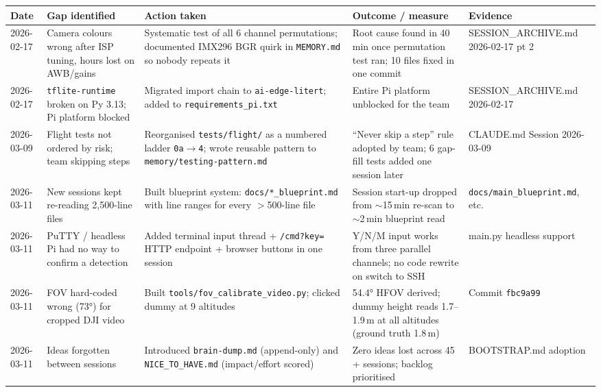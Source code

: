 \vspace{0.5em}
\footnotesize
{}
\begin{longtable}{@{}p{1.4cm} p{3.2cm} p{4.5cm} p{4.2cm} p{2.4cm}@{}}
\toprule
\textbf{Date} & \textbf{Gap identified} & \textbf{Action taken} & \textbf{Outcome / measure} & \textbf{Evidence} \\
\midrule
\endhead
2026-02-17 & Camera colours wrong after ISP tuning, hours lost on AWB/gains & Systematic test of all 6 channel permutations; documented IMX296 BGR quirk in \texttt{MEMORY.md} so nobody repeats it & Root cause found in 40\,min once permutation test ran; 10 files fixed in one commit & SESSION\_ARCHIVE.md 2026-02-17 pt 2 \\
2026-02-17 & \texttt{tflite-runtime} broken on Py 3.13; Pi platform blocked & Migrated import chain to \texttt{ai-edge-litert}; added to \texttt{requirements\_pi.txt} & Entire Pi platform unblocked for the team & SESSION\_ARCHIVE.md 2026-02-17 \\
2026-03-09 & Flight tests not ordered by risk; team skipping steps & Reorganised \texttt{tests/flight/} as a numbered ladder \texttt{0a}$\rightarrow$\texttt{4}; wrote reusable pattern to \texttt{memory/testing-pattern.md} & ``Never skip a step'' rule adopted by team; 6 gap-fill tests added one session later & CLAUDE.md Session 2026-03-09 \\
2026-03-11 & New sessions kept re-reading 2{,}500-line files & Built blueprint system: \texttt{docs/*\_blueprint.md} with line ranges for every $>$500-line file & Session start-up dropped from $\sim$15\,min re-scan to $\sim$2\,min blueprint read & \texttt{docs/main\_blueprint.md}, etc. \\
2026-03-11 & PuTTY / headless Pi had no way to confirm a detection & Added terminal input thread + \texttt{/cmd?key=} HTTP endpoint + browser buttons in one session & Y/N/M input works from three parallel channels; no code rewrite on switch to SSH & main.py headless support \\
2026-03-11 & FOV hard-coded wrong (73°) for cropped DJI video & Built \texttt{tools/fov\_calibrate\_video.py}; clicked dummy at 9 altitudes & 54.4° HFOV derived; dummy height reads 1.7–1.9\,m at all altitudes (ground truth 1.8\,m) & Commit \texttt{fbc9a99} \\
2026-03-11 & Ideas forgotten between sessions & Introduced \texttt{brain-dump.md} (append-only) and \texttt{NICE\_TO\_HAVE.md} (impact/effort scored) & Zero ideas lost across 45\,+ sessions; backlog prioritised & BOOTSTRAP.md adoption \\

\end{longtable}
